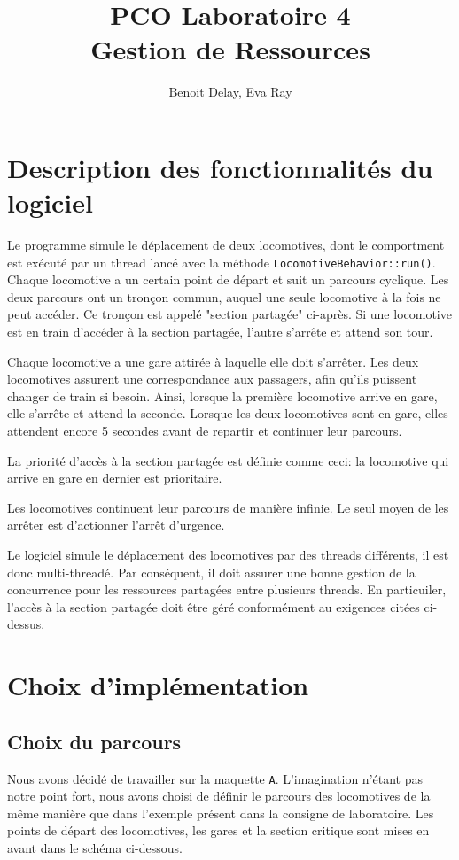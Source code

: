 \documentclass{article}
\title{PCO Laboratoire 4 \\
\large Gestion de Ressources}
\author{Benoit Delay, Eva Ray}
\begin{document}
\maketitle

\section*{Description des fonctionnalités du logiciel}

Le programme simule le déplacement de deux locomotives, dont le comportment est exécuté par un thread lancé avec la méthode \texttt{LocomotiveBehavior::run()}. 
Chaque locomotive a un certain point de départ et suit un parcours cyclique. Les deux
parcours ont un tronçon commun, auquel une seule locomotive à la fois ne peut accéder. Ce tronçon est appelé "section partagée" ci-après. Si une
locomotive est en train d'accéder à la section partagée, l'autre s'arrête et attend son tour. 

Chaque locomotive a une gare attirée à laquelle elle doit s'arrêter. Les deux locomotives assurent une correspondance aux passagers, 
afin qu'ils puissent changer de train si besoin. Ainsi, lorsque la première locomotive arrive en gare, elle s'arrête et attend la seconde. 
Lorsque les deux locomotives sont en gare, elles attendent encore 5 secondes avant de repartir et continuer leur parcours. 

La priorité d'accès à la section partagée est définie comme ceci: la locomotive qui arrive en gare en dernier est prioritaire. 

Les locomotives continuent leur parcours de manière infinie. Le seul moyen de les arrêter est d'actionner l'arrêt d'urgence. 

Le logiciel simule le déplacement des locomotives par des threads différents, il est donc multi-threadé. Par conséquent, il doit 
assurer une bonne gestion de la concurrence pour les ressources partagées entre plusieurs threads. En particuiler, l'accès à la section
partagée doit être géré conformément au exigences citées ci-dessus. 

\section*{Choix d'implémentation}
\subsection*{Choix du parcours}
Nous avons décidé de travailler sur la maquette \texttt{A}. L'imagination n'étant pas notre point fort, nous avons choisi de définir le parcours des
locomotives de la même manière que dans l'exemple présent dans la consigne de laboratoire. Les points de départ des locomotives, les gares et la
section critique sont mises en avant dans le schéma ci-dessous. 
\end{document}
